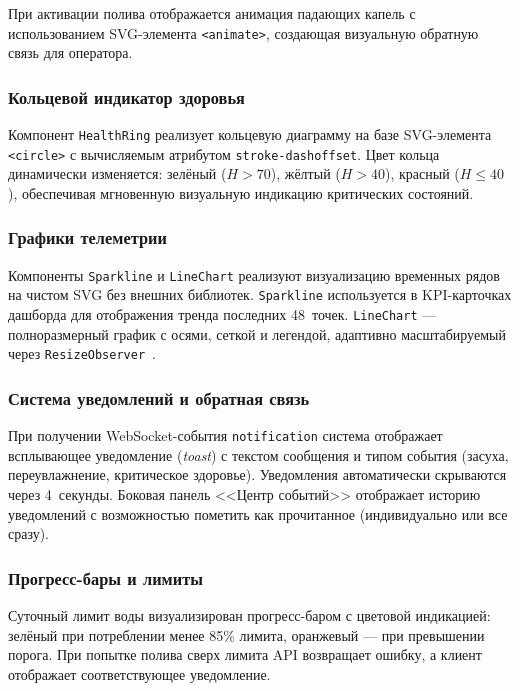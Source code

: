 При активации полива отображается анимация падающих капель
с использованием SVG-элемента \texttt{<animate>},
создающая визуальную обратную связь для оператора.

\subsubsection{Кольцевой индикатор здоровья}

Компонент \texttt{HealthRing} реализует кольцевую диаграмму
на базе SVG-элемента \texttt{<circle>} с вычисляемым
атрибутом \texttt{stroke-dashoffset}. Цвет кольца
динамически изменяется: зелёный ($H > 70$), жёлтый
($H > 40$), красный ($H \leq 40$), обеспечивая мгновенную
визуальную индикацию критических состояний.

\subsubsection{Графики телеметрии}

Компоненты \texttt{Sparkline} и \texttt{LineChart} реализуют
визуализацию временных рядов на чистом SVG без внешних
библиотек. \texttt{Sparkline} используется в KPI-карточках
дашборда для отображения тренда последних 48~точек.
\texttt{LineChart} --- полноразмерный график с осями,
сеткой и легендой, адаптивно масштабируемый через
\texttt{ResizeObserver}~\cite{mdn_resizeobserver}.

\subsubsection{Система уведомлений и обратная связь}

При получении WebSocket-события \texttt{notification}
система отображает всплывающее уведомление (\emph{toast})
с текстом сообщения и типом события (засуха, переувлажнение,
критическое здоровье). Уведомления автоматически скрываются
через 4~секунды. Боковая панель <<Центр событий>> отображает
историю уведомлений с возможностью пометить как прочитанное
(индивидуально или все сразу).

\subsubsection{Прогресс-бары и лимиты}

Суточный лимит воды визуализирован прогресс-баром
с цветовой индикацией: зелёный при потреблении менее 85\%
лимита, оранжевый --- при превышении порога. При попытке
полива сверх лимита API возвращает ошибку, а клиент
отображает соответствующее уведомление.

